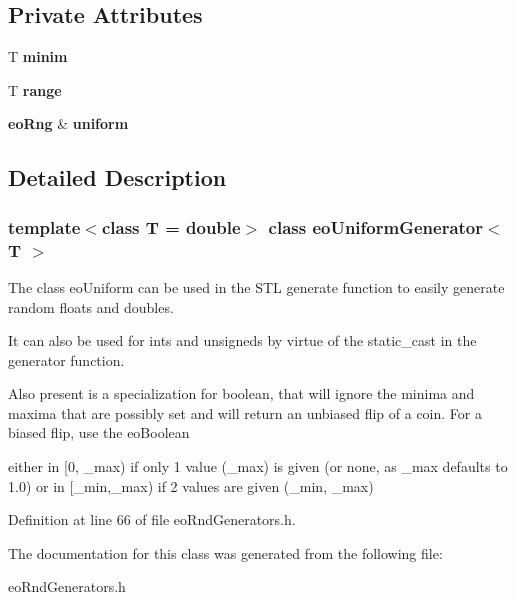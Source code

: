 \subsection*{Private Attributes}
\begin{CompactItemize}
\item 
T {\bf minim}\label{classeo_uniform_generator_r0}

\item 
T {\bf range}\label{classeo_uniform_generator_r1}

\item 
{\bf eo\-Rng} \& {\bf uniform}\label{classeo_uniform_generator_r2}

\end{CompactItemize}


\subsection{Detailed Description}
\subsubsection*{template$<$class T = double$>$ class eo\-Uniform\-Generator$<$ T $>$}

The class eo\-Uniform can be used in the STL generate function to easily generate random floats and doubles. 

It can also be used for ints and unsigneds by virtue of the static\_\-cast in the generator function.

Also present is a specialization for boolean, that will ignore the minima and maxima that are possibly set and will return an unbiased flip of a coin. For a biased flip, use the eo\-Boolean

either in [0, \_\-max) if only 1 value (\_\-max) is given (or none, as \_\-max defaults to 1.0) or in [\_\-min,\_\-max) if 2 values are given (\_\-min, \_\-max) 



Definition at line 66 of file eo\-Rnd\-Generators.h.

The documentation for this class was generated from the following file:\begin{CompactItemize}
\item 
eo\-Rnd\-Generators.h\end{CompactItemize}

